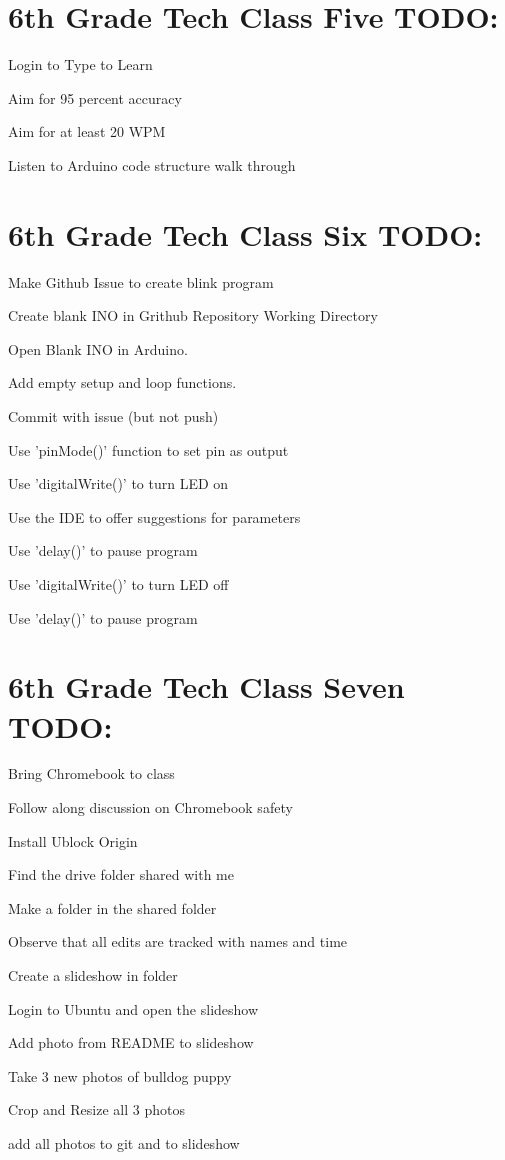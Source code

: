 \documentclass{article}
\begin{document}
\section{6th Grade Tech Class Five TODO:}
\begin{todolist}
	\item Login to Type to Learn
	\item Aim for 95 percent accuracy
	\item Aim for at least 20 WPM
	\item Listen to Arduino code structure walk through
\end{todolist}

\section{6th Grade Tech Class Six TODO:}
\begin{todolist}
	\item Make Github Issue to create blink program
	\item Create blank INO in Grithub Repository Working Directory
	\item Open Blank INO in Arduino.
	\item Add empty setup and loop functions.
	\item Commit with issue (but not push)
	\item Use 'pinMode()' function to set pin as output
	\item Use 'digitalWrite()' to turn LED on
	\item Use the IDE to offer suggestions for parameters
	\item Use 'delay()' to pause program
	\item Use 'digitalWrite()' to turn LED off
	\item Use 'delay()' to pause program
\end{todolist}
\newpage
\section{6th Grade Tech Class Seven TODO:}
\begin{todolist}
	\item Bring Chromebook to class
	\item Follow along discussion on Chromebook safety
	\item Install Ublock Origin
	\item Find the drive folder shared with me
	\item Make a folder in the shared folder
	\item Observe that all edits are tracked with names and time
	\item Create a slideshow in folder
	\item Login to Ubuntu and open the slideshow
	\item Add photo from README to slideshow
	\item Take 3 new photos of bulldog puppy
	\item Crop and Resize all 3 photos
	\item add all photos to git and to slideshow
\end{todolist}
\end{document}
